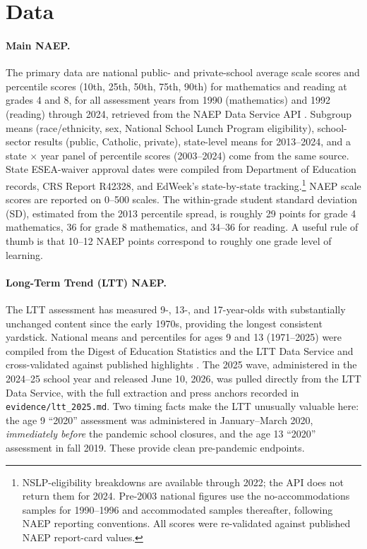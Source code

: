 \documentclass[11pt]{article}
\begin{document}
\section{Data}\label{sec:data}

\paragraph{Main NAEP.} The primary data are national public- and private-school average scale scores and percentile scores (10th, 25th, 50th, 75th, 90th) for mathematics and reading at grades 4 and 8, for all assessment years from 1990 (mathematics) and 1992 (reading) through 2024, retrieved from the NAEP Data Service API \citep{naepapi}. Subgroup means (race/ethnicity, sex, National School Lunch Program eligibility), school-sector results (public, Catholic, private), state-level means for 2013--2024, and a state $\times$ year panel of percentile scores (2003--2024) come from the same source. State ESEA-waiver approval dates were compiled from Department of Education records, CRS Report R42328, and EdWeek's state-by-state tracking.\footnote{NSLP-eligibility breakdowns are available through 2022; the API does not return them for 2024. Pre-2003 national figures use the no-accommodations samples for 1990--1996 and accommodated samples thereafter, following NAEP reporting conventions. All scores were re-validated against published NAEP report-card values.} NAEP scale scores are reported on 0--500 scales. The within-grade student standard deviation (SD), estimated from the 2013 percentile spread, is roughly 29 points for grade 4 mathematics, 36 for grade 8 mathematics, and 34--36 for reading. A useful rule of thumb is that 10--12 NAEP points correspond to roughly one grade level of learning.

\paragraph{Long-Term Trend (LTT) NAEP.} The LTT assessment has measured 9-, 13-, and 17-year-olds with substantially unchanged content since the early 1970s, providing the longest consistent yardstick. National means and percentiles for ages 9 and 13 (1971--2025) were compiled from the Digest of Education Statistics and the LTT Data Service and cross-validated against published highlights \citep{nces2023ltt}. The 2025 wave, administered in the 2024--25 school year and released June 10, 2026, was pulled directly from the LTT Data Service, with the full extraction and press anchors recorded in \texttt{evidence/ltt\_2025.md}. Two timing facts make the LTT unusually valuable here: the age 9 ``2020'' assessment was administered in January--March 2020, \emph{immediately before} the pandemic school closures, and the age 13 ``2020'' assessment in fall 2019. These provide clean pre-pandemic endpoints.
\end{document}
